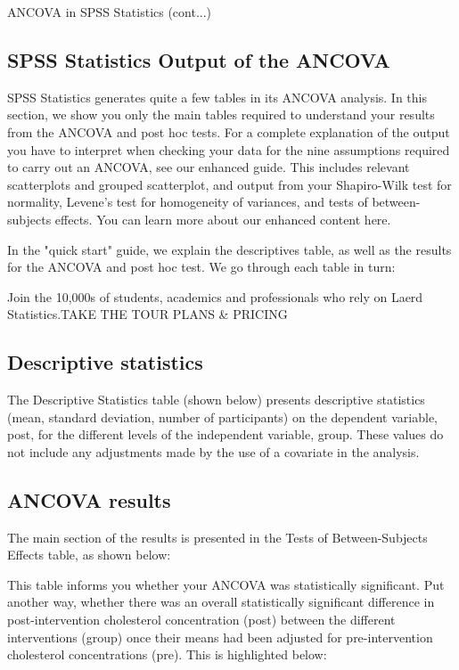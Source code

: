 ANCOVA in SPSS Statistics (cont...)

\subsection{SPSS Statistics Output of the ANCOVA}
SPSS Statistics generates quite a few tables in its ANCOVA analysis. In this section, we show you only the main tables required to understand your results from the ANCOVA and post hoc tests. For a complete explanation of the output you have to interpret when checking your data for the nine assumptions required to carry out an ANCOVA, see our enhanced guide. This includes relevant scatterplots and grouped scatterplot, and output from your Shapiro-Wilk test for normality, Levene's test for homogeneity of variances, and tests of between-subjects effects. You can learn more about our enhanced content here.

In the "quick start" guide, we explain the descriptives table, as well as the results for the ANCOVA and post hoc test. We go through each table in turn:

Join the 10,000s of students, academics and professionals who rely on Laerd Statistics.TAKE THE TOUR PLANS & PRICING

\subsection{Descriptive statistics}
The Descriptive Statistics table (shown below) presents descriptive statistics (mean, standard deviation, number of participants) on the dependent variable, post, for the different levels of the independent variable, group. These values do not include any adjustments made by the use of a covariate in the analysis.


\subsection{ANCOVA results}
The main section of the results is presented in the Tests of Between-Subjects Effects table, as shown below:


This table informs you whether your ANCOVA was statistically significant. Put another way, whether there was an overall statistically significant difference in post-intervention cholesterol concentration (post) between the different interventions (group) once their means had been adjusted for pre-intervention cholesterol concentrations (pre). This is highlighted below:



